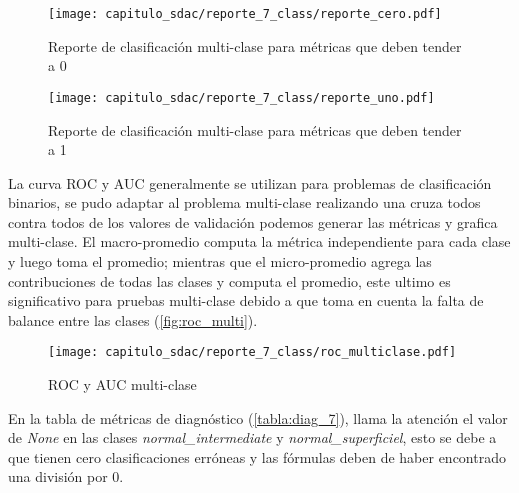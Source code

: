 \begin{figure}[H]
    \centering
    \texttt{[image: capitulo\_sdac/reporte\_7\_class/reporte\_cero.pdf]}
    \caption{Reporte de clasificación multi-clase para métricas que deben tender a 0}\label{fig:reporte_7_0}
\end{figure}

\begin{figure}[H]
    \centering
    \texttt{[image: capitulo\_sdac/reporte\_7\_class/reporte\_uno.pdf]}
    \caption{Reporte de clasificación multi-clase para métricas que deben tender a 1}\label{fig:reporte_7_1}
\end{figure}

La curva ROC y AUC generalmente se utilizan para problemas de clasificación
binarios, se pudo adaptar al problema multi-clase  realizando una cruza todos
contra todos de los valores de validación podemos generar las métricas y grafica
multi-clase. El macro-promedio computa la métrica independiente para cada clase
y luego toma el promedio; mientras que el micro-promedio agrega las
contribuciones de todas las clases y computa el promedio, este ultimo es
significativo para pruebas multi-clase debido a que toma en cuenta la falta de
balance entre las clases (\autoref{fig:roc_multi}).

\begin{figure}[H]
    \centering
    \texttt{[image: capitulo\_sdac/reporte\_7\_class/roc\_multiclase.pdf]}
    \caption{ROC y AUC multi-clase}\label{fig:roc_multi}
\end{figure} 

En la tabla de métricas de diagnóstico (\autoref{tabla:diag_7}), llama la
atención el valor de \emph{None} en las clases \emph{normal\_intermediate} y
\emph{normal\_superficiel}, esto se debe a que tienen cero clasificaciones
erróneas y las fórmulas deben de haber encontrado una división por 0. 


